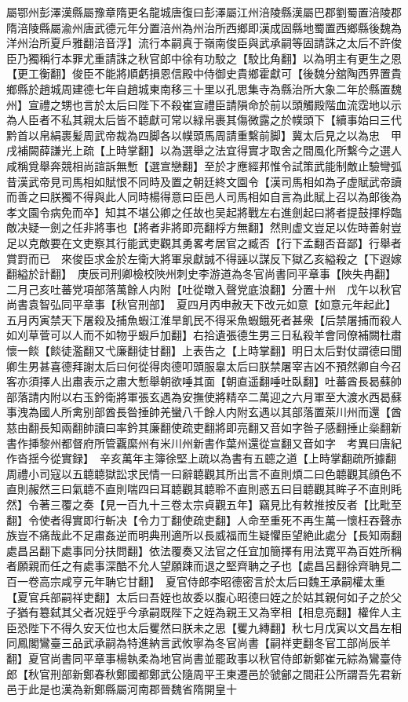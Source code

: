 屬鄂州彭澤漢縣屬豫章隋更名龍城唐復曰彭澤屬江州涪陵縣漢屬巴郡劉蜀置涪陵郡隋涪陵縣屬渝州唐武德元年分置涪州為州治所西鄉即漢成固縣地蜀置西鄉縣後魏為洋州治所夏戶雅翻涪音浮】流行本嗣真于嶺南俊臣與武承嗣等固請誅之太后不許俊臣乃獨稱行本罪尤重請誅之秋官郎中徐有功駮之【駮比角翻】以為明主有更生之恩【更工衡翻】俊臣不能將順虧損恩信殿中侍御史貴鄉霍獻可【後魏分舘陶西界置貴鄉縣於趙城周建德七年自趙城東南移三十里以孔思集寺為縣治所大象二年於縣置魏州】宣禮之甥也言於太后曰陛下不殺崔宣禮臣請隕命於前以頭觸殿階血流霑地以示為人臣者不私其親太后皆不聼獻可常以緑帛裹其傷微露之於幞頭下【續事始曰三代黔首以帛絹裹髪周武帝裁為四脚各以幞頭馬周請重繫前脚】冀太后見之以為忠　甲戌補闕薛謙光上疏【上時掌翻】以為選舉之法宜得實才取舍之間風化所繫今之選人咸稱覓舉奔競相尚諠訴無慙【選宣戀翻】至於才應經邦惟令試策武能制敵止驗彎弧昔漢武帝見司馬相如賦恨不同時及置之朝廷終文園令【漢司馬相如為子虚賦武帝讀而善之曰朕獨不得與此人同時楊得意曰臣邑人司馬相如自言為此賦上召以為郎後為孝文園令病免而卒】知其不堪公卿之任故也吴起將戰左右進劍起曰將者提鼓揮桴臨敵决疑一劍之任非將事也【將者非將即亮翻桴方無翻】然則虚文豈足以佐時善射豈足以克敵要在文吏察其行能武吏觀其勇畧考居官之臧否【行下孟翻否音鄙】行舉者賞罸而已　來俊臣求金於左衛大將軍泉獻誠不得誣以謀反下獄乙亥縊殺之【下遐嫁翻縊於計翻】　庚辰司刑卿檢校陜州刺史李游道為冬官尚書同平章事【陜失冉翻】　二月己亥吐蕃党項部落萬餘人内附【吐從暾入聲党底浪翻】分置十州　戊午以秋官尚書袁智弘同平章事【秋官刑部】　夏四月丙申赦天下改元如意【如意元年起此】　五月丙寅禁天下屠殺及捕魚蝦江淮旱飢民不得采魚蝦餓死者甚衆【后禁屠捕而殺人如刈草菅可以人而不如物乎蝦戶加翻】右拾遺張德生男三日私殺羊會同僚補闕杜肅懷一餤【餤徒濫翻又弋廉翻徒甘翻】上表告之【上時掌翻】明日太后對仗謂德曰聞卿生男甚喜德拜謝太后曰何從得肉德叩頭服辠太后曰朕禁屠宰吉凶不預然卿自今召客亦須擇人出肅表示之肅大慙舉朝欲唾其面【朝直遥翻唾吐臥翻】吐蕃酋長曷蘇帥部落請内附以右玉鈐衛將軍張玄遇為安撫使將精卒二萬迎之六月軍至大渡水西曷蘇事洩為國人所禽别部酋長昝捶帥羌蠻八千餘人内附玄遇以其部落置萊川州而還【酋慈由翻長知兩翻帥讀曰率鈐其廉翻使疏吏翻將即亮翻又音如字昝子感翻捶止橤翻新書作挿黎州都督府所管覊縻州有米川州新書作葉州還從宣翻又音如字　考異曰唐紀作沓揺今從實録】　辛亥萬年主簿徐堅上疏以為書有五聼之道【上時掌翻疏所據翻周禮小司寇以五聼聼獄訟求民情一曰辭聼觀其所出言不直則煩二曰色聼觀其顔色不直則赧然三曰氣聼不直則喘四曰耳聼觀其聼聆不直則惑五曰目聼觀其眸子不直則眊然】令著三覆之奏【見一百九十三卷太宗貞觀五年】竊見比有敕推按反者【比毗至翻】令使者得實即行斬决【令力丁翻使疏吏翻】人命至重死不再生萬一懷枉吞聲赤族豈不痛哉此不足肅姦逆而明典刑適所以長威福而生疑懼臣望絶此處分【長知兩翻處昌呂翻下處事同分扶問翻】依法覆奏又法官之任宜加簡擇有用法寛平為百姓所稱者願親而任之有處事深酷不允人望願踈而退之堅齊聃之子也【處昌呂翻徐齊聃見二百一卷高宗咸亨元年聃它甘翻】　夏官侍郎李昭德密言於太后曰魏王承嗣權太重【夏官兵部嗣祥吏翻】太后曰吾姪也故委以腹心昭德曰姪之於姑其親何如子之於父子猶有簒弑其父者况姪乎今承嗣既陛下之姪為親王又為宰相【相息亮翻】權侔人主臣恐陛下不得久安天位也太后矍然曰朕未之思【矍九縳翻】秋七月戊寅以文昌左相同鳳閣鸞臺三品武承嗣為特進納言武攸寧為冬官尚書【嗣祥吏翻冬官工部尚辰羊翻】夏官尚書同平章事楊執柔為地官尚書並罷政事以秋官侍郎新鄭崔元綜為鸞臺侍郎【秋官刑部新鄭春秋鄭國都鄭武公隨周平王東遷邑於虢鄶之間莊公所謂吾先君新邑于此是也漢為新鄭縣屬河南郡晉魏省隋開皇十